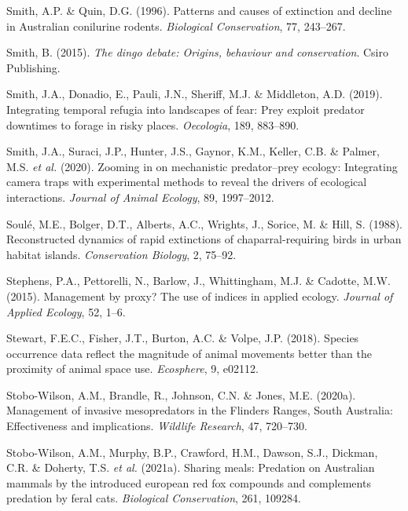 \documentclass[11pt,a4paper,titlepage,twoside,openright]{style/unimelbthesis}
\begin{document}
\begin{mainmatter}
\leavevmode\hypertarget{ref-smith1996patterns}{}%
Smith, A.P. \& Quin, D.G. (1996). Patterns and causes of extinction and decline in Australian conilurine rodents. \emph{Biological Conservation}, 77, 243--267.

\leavevmode\hypertarget{ref-smith2015dingo}{}%
Smith, B. (2015). \emph{The dingo debate: Origins, behaviour and conservation}. Csiro Publishing.

\leavevmode\hypertarget{ref-smith2019integrating}{}%
Smith, J.A., Donadio, E., Pauli, J.N., Sheriff, M.J. \& Middleton, A.D. (2019). Integrating temporal refugia into landscapes of fear: Prey exploit predator downtimes to forage in risky places. \emph{Oecologia}, 189, 883--890.

\leavevmode\hypertarget{ref-smith2020zooming}{}%
Smith, J.A., Suraci, J.P., Hunter, J.S., Gaynor, K.M., Keller, C.B. \& Palmer, M.S. \emph{et al.} (2020). Zooming in on mechanistic predator--prey ecology: Integrating camera traps with experimental methods to reveal the drivers of ecological interactions. \emph{Journal of Animal Ecology}, 89, 1997--2012.

\leavevmode\hypertarget{ref-soule1988reconstructed}{}%
Soulé, M.E., Bolger, D.T., Alberts, A.C., Wrights, J., Sorice, M. \& Hill, S. (1988). Reconstructed dynamics of rapid extinctions of chaparral-requiring birds in urban habitat islands. \emph{Conservation Biology}, 2, 75--92.

\leavevmode\hypertarget{ref-stephens2015management}{}%
Stephens, P.A., Pettorelli, N., Barlow, J., Whittingham, M.J. \& Cadotte, M.W. (2015). Management by proxy? The use of indices in applied ecology. \emph{Journal of Applied Ecology}, 52, 1--6.

\leavevmode\hypertarget{ref-stewart2018species}{}%
Stewart, F.E.C., Fisher, J.T., Burton, A.C. \& Volpe, J.P. (2018). Species occurrence data reflect the magnitude of animal movements better than the proximity of animal space use. \emph{Ecosphere}, 9, e02112.

\leavevmode\hypertarget{ref-stobo2020management}{}%
Stobo-Wilson, A.M., Brandle, R., Johnson, C.N. \& Jones, M.E. (2020a). Management of invasive mesopredators in the Flinders Ranges, South Australia: Effectiveness and implications. \emph{Wildlife Research}, 47, 720--730.

\leavevmode\hypertarget{ref-stobo2021sharing}{}%
Stobo-Wilson, A.M., Murphy, B.P., Crawford, H.M., Dawson, S.J., Dickman, C.R. \& Doherty, T.S. \emph{et al.} (2021a). Sharing meals: Predation on Australian mammals by the introduced european red fox compounds and complements predation by feral cats. \emph{Biological Conservation}, 261, 109284.


\end{mainmatter}
\end{document}
